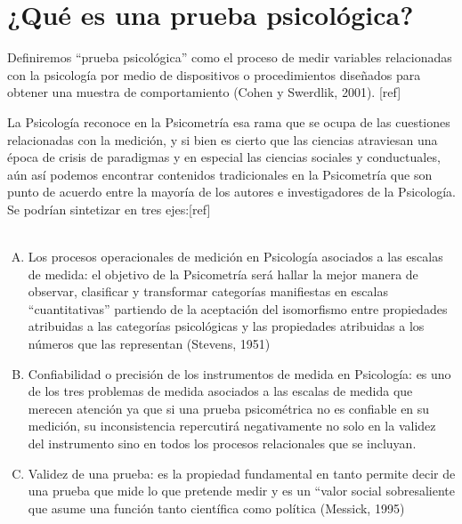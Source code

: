 \section{¿Qué es una prueba psicológica?}

Definiremos ``prueba psicológica'' como el proceso de medir variables relacionadas con la psicología por medio de dispositivos o procedimientos diseñados para obtener una muestra de comportamiento (Cohen y Swerdlik, 2001). [ref]

La Psicología reconoce en la Psicometría esa rama que se ocupa de las cuestiones relacionadas con la medición, y si bien es cierto que las ciencias atraviesan una época de crisis de paradigmas y en especial las ciencias sociales y conductuales, aún así podemos encontrar contenidos tradicionales en la Psicometría que son punto de acuerdo entre la mayoría de los autores e investigadores de la Psicología. Se podrían sintetizar en tres ejes:[ref]
\\\\
\begin{enumerate}[A)]
\item Los procesos operacionales de medición en Psicología asociados a las escalas de medida: el objetivo de la Psicometría será hallar la mejor manera de observar, clasificar y transformar categorías manifiestas en escalas ``cuantitativas'' partiendo de la aceptación del isomorfismo entre propiedades atribuidas a las categorías psicológicas y las propiedades atribuidas a los números que las representan (Stevens, 1951)
\item Confiabilidad o precisión de los instrumentos de medida en Psicología: es uno de los tres problemas de medida asociados a las escalas de medida que merecen atención ya que si una prueba psicométrica no es confiable en su medición, su inconsistencia repercutirá negativamente no solo en la validez del instrumento sino en todos los procesos relacionales que se incluyan.
\item Validez de una prueba: es la propiedad fundamental en tanto permite decir de una prueba que mide lo que pretende medir y es un “valor social sobresaliente que asume una función tanto científica como política (Messick, 1995)
\end{enumerate}